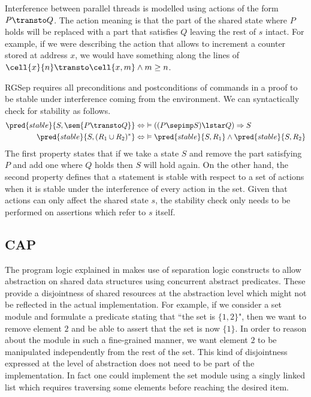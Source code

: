 Interference between parallel threads is modelled using actions of the form $P \transto Q$. The action meaning is that the part of the shared state where $P$ holds will be replaced with a part that satisfies $Q$ leaving the rest of $s$ intact. For example, if we were describing the action that allows to increment a counter stored at address $x$, we would have something along the lines of $\cell{x}{n} \transto \cell{x, m} \land m \geq n$.

RGSep requires all preconditions and postconditions of commands in a proof to be stable under interference coming from the environment. We can syntactically check for stability as follows.
\begin{align*}
\pred{stable}{S, \sem{P \transto Q}} &\Leftrightarrow\ \vDash ((P \sepimp S) \lstar Q) \Rightarrow S
\\
\pred{stable}{S, (R_1 \cup R_2)^*} &\Leftrightarrow\ \vDash \pred{stable}{S, R_1} \land \pred{stable}{S, R_2}
\end{align*}
The first property states that if we take a state $S$ and remove the part satisfying $P$ and add one where $Q$ holds then $S$ will hold again. On the other hand, the second property defines that a statement is stable with respect to a set of actions when it is stable under the interference of every action in the set. Given that actions can only affect the shared state $s$, the stability check only needs to be performed on assertions which refer to $s$ itself.

\subsection{CAP}

\label{sec:cap}

The program logic explained in \cite{cap} makes use of separation logic constructs to allow abstraction on shared data structures using concurrent abstract predicates. These provide a disjointness of shared resources at the abstraction level which might not be reflected in the actual implementation. For example, if we consider a set module and formulate a predicate stating that ``the set is $\{ 1,2 \}$", then we want to remove element $2$ and be able to assert that the set is now $\{ 1 \}$. In order to reason about the module in such a fine-grained manner, we want element $2$ to be manipulated independently from the rest of the set. This kind of disjointness expressed at the level of abstraction does not need to be part of the implementation. In fact one could implement the set module using a singly linked list which requires traversing some elements before reaching the desired item.

